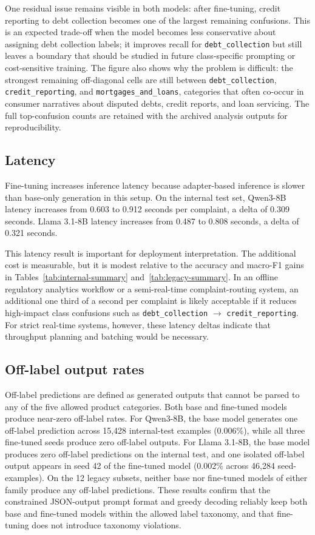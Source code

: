 \documentclass{elektr}
\begin{document}
One residual issue remains visible in both models: after fine-tuning, credit reporting to debt collection becomes one of the largest remaining confusions. This is an expected trade-off when the model becomes less conservative about assigning debt collection labels; it improves recall for \texttt{debt\_collection} but still leaves a boundary that should be studied in future class-specific prompting or cost-sensitive training. The figure also shows why the problem is difficult: the strongest remaining off-diagonal cells are still between \texttt{debt\_collection}, \texttt{credit\_reporting}, and \texttt{mortgages\_and\_loans}, categories that often co-occur in consumer narratives about disputed debts, credit reports, and loan servicing. The full top-confusion counts are retained with the archived analysis outputs for reproducibility.

\subsection{Latency}

Fine-tuning increases inference latency because adapter-based inference is slower than base-only generation in this setup. On the internal test set, Qwen3-8B latency increases from 0.603 to 0.912 seconds per complaint, a delta of 0.309 seconds. Llama 3.1-8B latency increases from 0.487 to 0.808 seconds, a delta of 0.321 seconds.

This latency result is important for deployment interpretation. The additional cost is measurable, but it is modest relative to the accuracy and macro-F1 gains in Tables~\ref{tab:internal-summary} and~\ref{tab:legacy-summary}. In an offline regulatory analytics workflow or a semi-real-time complaint-routing system, an additional one third of a second per complaint is likely acceptable if it reduces high-impact class confusions such as \texttt{debt\_collection} $\rightarrow$ \texttt{credit\_reporting}. For strict real-time systems, however, these latency deltas indicate that throughput planning and batching would be necessary.

\subsection{Off-label output rates}

Off-label predictions are defined as generated outputs that cannot be parsed to any of the five allowed product categories. Both base and fine-tuned models produce near-zero off-label rates. For Qwen3-8B, the base model generates one off-label prediction across 15,428 internal-test examples (0.006\%), while all three fine-tuned seeds produce zero off-label outputs. For Llama 3.1-8B, the base model produces zero off-label predictions on the internal test, and one isolated off-label output appears in seed 42 of the fine-tuned model (0.002\% across 46,284 seed-examples). On the 12 legacy subsets, neither base nor fine-tuned models of either family produce any off-label predictions. These results confirm that the constrained JSON-output prompt format and greedy decoding reliably keep both base and fine-tuned models within the allowed label taxonomy, and that fine-tuning does not introduce taxonomy violations.
\end{document}
